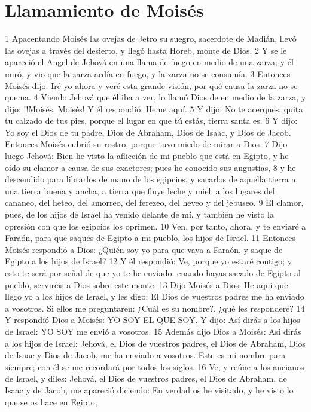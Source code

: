 \section{Llamamiento de Moisés}
1 Apacentando Moisés las ovejas de Jetro su suegro, sacerdote de Madián, llevó las ovejas a través del desierto, y llegó hasta Horeb, monte de Dios.
2 Y se le apareció el Angel de Jehová en una llama de fuego en medio de una zarza; y él miró, y vio que la zarza ardía en fuego, y la zarza no se consumía.
3 Entonces Moisés dijo: Iré yo ahora y veré esta grande visión, por qué causa la zarza no se quema.
4 Viendo Jehová que él iba a ver, lo llamó Dios de en medio de la zarza, y dijo: !!Moisés, Moisés! Y él respondió: Heme aquí.
5 Y dijo: No te acerques; quita tu calzado de tus pies, porque el lugar en que tú estás, tierra santa es.
6 Y dijo: Yo soy el Dios de tu padre, Dios de Abraham, Dios de Isaac, y Dios de Jacob. Entonces Moisés cubrió su rostro, porque tuvo miedo de mirar a Dios.
7 Dijo luego Jehová: Bien he visto la aflicción de mi pueblo que está en Egipto, y he oído su clamor a causa de sus exactores; pues he conocido sus angustias,
8 y he descendido para librarlos de mano de los egipcios, y sacarlos de aquella tierra a una tierra buena y ancha, a tierra que fluye leche y miel, a los lugares del cananeo, del heteo, del amorreo, del ferezeo, del heveo y del jebuseo.
9 El clamor, pues, de los hijos de Israel ha venido delante de mí, y también he visto la opresión con que los egipcios los oprimen.
10 Ven, por tanto, ahora, y te enviaré a Faraón, para que saques de Egipto a mi pueblo, los hijos de Israel.
11 Entonces Moisés respondió a Dios: ¿Quién soy yo para que vaya a Faraón, y saque de Egipto a los hijos de Israel?
12 Y él respondió: Ve, porque yo estaré contigo; y esto te será por señal de que yo te he enviado: cuando hayas sacado de Egipto al pueblo, serviréis a Dios sobre este monte.
13 Dijo Moisés a Dios: He aquí que llego yo a los hijos de Israel, y les digo: El Dios de vuestros padres me ha enviado a vosotros. Si ellos me preguntaren: ¿Cuál es su nombre?, ¿qué les responderé?
14 Y respondió Dios a Moisés: YO SOY EL QUE SOY. Y dijo: Así dirás a los hijos de Israel: YO SOY me envió a vosotros.
15 Además dijo Dios a Moisés: Así dirás a los hijos de Israel: Jehová, el Dios de vuestros padres, el Dios de Abraham, Dios de Isaac y Dios de Jacob, me ha enviado a vosotros. Este es mi nombre para siempre; con él se me recordará por todos los siglos.
16 Ve, y reúne a los ancianos de Israel, y diles: Jehová, el Dios de vuestros padres, el Dios de Abraham, de Isaac y de Jacob, me apareció diciendo: En verdad os he visitado, y he visto lo que se os hace en Egipto;
